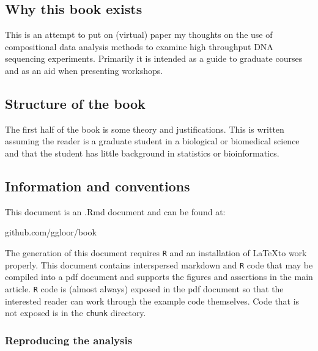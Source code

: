\documentclass[
  onecolumn]{article}
\begin{document}
\hypertarget{why-this-book-exists}{%
\subsection*{Why this book exists}\label{why-this-book-exists}}

This is an attempt to put on (virtual) paper my thoughts on the use of compositional data analysis methods to examine high throughput DNA sequencing experiments. Primarily it is intended as a guide to graduate courses and as an aid when presenting workshops.

\hypertarget{structure-of-the-book}{%
\subsection*{Structure of the book}\label{structure-of-the-book}}

The first half of the book is some theory and justifications. This is written assuming the reader is a graduate student in a biological or biomedical science and that the student has little background in statistics or bioinformatics.

\hypertarget{information-and-conventions}{%
\subsection*{Information and conventions}\label{information-and-conventions}}

This document is an .Rmd document and can be found at:

github.com/ggloor/book

The generation of this document requires \texttt{R} and an installation of \LaTeX to work properly. This document contains interspersed markdown and \texttt{R} code that may be compiled into a pdf document and supports the figures and assertions in the main article. \texttt{R} code is (almost always) exposed in the pdf document so that the interested reader can work through the example code themselves. Code that is not exposed is in the \texttt{chunk} directory.

\hypertarget{reproducing-the-analysis}{%
\subsubsection{Reproducing the analysis}\label{reproducing-the-analysis}}
\end{document}
